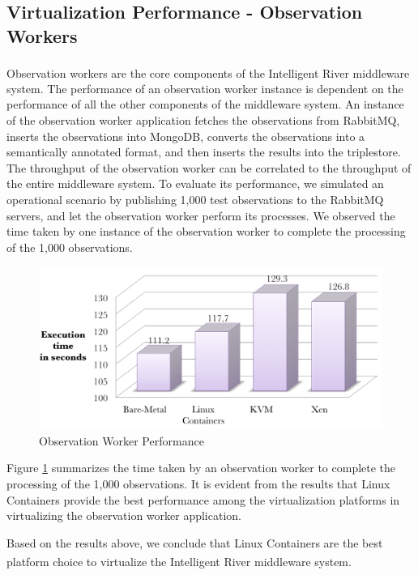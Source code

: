\subsection{Virtualization Performance - Observation Workers}

Observation workers are the core components of the Intelligent River\textsuperscript{\textregistered} middleware system. The performance of an observation worker instance is dependent on the performance of all the other components of the middleware system. An instance of the observation worker application fetches the observations from RabbitMQ, inserts the observations into MongoDB, converts the observations into a semantically annotated format, and then inserts the results into the triplestore. The throughput of the observation worker can be correlated to the throughput of the entire middleware system. To evaluate its performance, we simulated an operational scenario by publishing 1,000 test observations to the RabbitMQ servers, and let the observation worker perform its processes. We observed the time taken by one instance of the observation worker to complete the processing of the 1,000 observations.


\begin{figure}[H]
\centering
\includegraphics[width=150mm]{obsw.png}
\caption{Observation Worker Performance }
\label{fig:obsw}
\end{figure}

Figure \ref{fig:obsw} summarizes the time taken by an observation worker to complete the processing of the 1,000 observations. It is evident from the results that Linux Containers provide the best performance among the virtualization platforms in virtualizing the observation worker application.

Based on the results above, we conclude that Linux Containers are the best platform choice to virtualize the Intelligent River\textsuperscript{\textregistered} middleware system.
